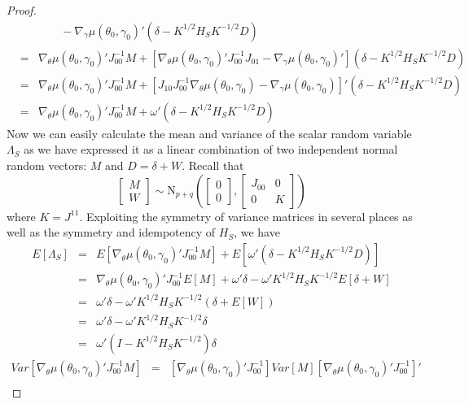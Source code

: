 \documentclass[12pt]{article}
\theoremstyle{definition}
\begin{document}
\begin{proof}
\begin{eqnarray*}
			&&\;\;\;\;\;\;\; - \nabla_\gamma \mu(\theta_0, \gamma_0)' \left(\delta -K^{1/2}H_S K^{-1/2}D\right)\\
			&=& \nabla_{\theta}\mu(\theta_0, \gamma_0)'J_{00}^{-1}M + \left[\nabla_{\theta}\mu(\theta_0, \gamma_0)' J_{00}^{-1}J_{01} - \nabla_\gamma \mu(\theta_0, \gamma_0)'\right]\left(\delta -K^{1/2}H_S K^{-1/2}D\right)\\
			&=& \nabla_{\theta}\mu(\theta_0, \gamma_0)'J_{00}^{-1}M + \left[J_{10}J_{00}^{-1}\nabla_{\theta}\mu(\theta_0, \gamma_0) - \nabla_\gamma \mu(\theta_0, \gamma_0)\right]'\left(\delta -K^{1/2}H_S K^{-1/2}D\right)\\
			&=& \nabla_{\theta}\mu(\theta_0, \gamma_0)'J_{00}^{-1}M + \omega'\left(\delta -K^{1/2}H_S K^{-1/2}D\right)
	\end{eqnarray*}
Now we can easily calculate the mean and variance of the scalar random variable $\Lambda_S$ as we have expressed it as a linear combination of two independent normal random vectors: $M$ and $D=\delta + W$. Recall that
	$$
	\left[\begin{array}{c}
		M\\
		W
	\end{array}\right] \sim \mbox{N}_{p+q}\left(
	\left[\begin{array}{c}
		0\\
		0
	\end{array}\right],
	\left[\begin{array}{cc}
		J_{00}&0\\
		0&K
	\end{array}\right]\right)
$$
where $K = J^{11}$. Exploiting the symmetry of variance matrices in several places as well as the symmetry and idempotency of $H_S$, we have
	\begin{eqnarray*}
		E[\Lambda_S] &=& E\left[\nabla_{\theta}\mu(\theta_0, \gamma_0)'J_{00}^{-1}M\right] + E\left[\omega'\left(\delta -K^{1/2}H_S K^{-1/2}D\right)\right]\\
			&=& \nabla_{\theta}\mu(\theta_0, \gamma_0)'J_{00}^{-1}E\left[M\right] + \omega' \delta -\omega' K^{1/2}H_S K^{-1/2}E[\delta + W]\\
			&=& \omega' \delta -\omega' K^{1/2}H_S K^{-1/2}\left(\delta +E[W]\right)\\
			&=& \omega' \delta -\omega' K^{1/2}H_S K^{-1/2}\delta\\
			&=& \omega' \left(I - K^{1/2}H_S K^{-1/2}\right)\delta
	\end{eqnarray*}
	\begin{eqnarray*}
		 Var\left[\nabla_{\theta}\mu(\theta_0,\gamma_0)'J_{00}^{-1}M\right] &=& \left[\nabla_{\theta}\mu(\theta_0,\gamma_0)'J_{00}^{-1}\right]Var[M]\left[\nabla_{\theta}\mu(\theta_0,\gamma_0)'J_{00}^{-1}\right]'\\

\end{eqnarray*}
\end{proof}
\end{document}
